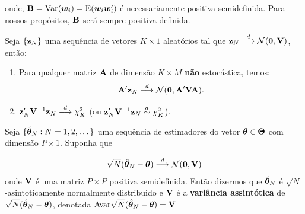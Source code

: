 \documentclass[11pt, oneside, a4paper, article]{article}
\numberwithin{equation}{section}
\begin{document}
\begin{description}
\begin{teo}
\noindent
onde, $\mathbf{B} = \text{Var}(\boldsymbol{w}_{i}) = \text{E}( \boldsymbol{w}_{i} \boldsymbol{w}_{i}')$ é necessariamente positiva semidefinida.
Para nossos propósitos, $\mathbf{B}$ será sempre positiva definida.
\end{teo}

\begin{cor}[]
\citet[Cor 3.2, p.39]{wool-2010}

Seja $\{\mathbf{z}_{N}\}$ uma sequência de vetores $K \times 1$ aleatórios tal que
$\mathbf{z}_{N}  \overset{d}{\longrightarrow}  \mathcal{N}(\boldsymbol{0}, \mathbf{V})$, então:

\begin{enumerate}
	\item 
Para qualquer matriz $\mathbf{A}$ de dimensão $K \times M$ \textbf{não} estocástica, temos:
\begin{align*}
\mathbf{A}' \mathbf{z}_{N}  \overset{d}{\longrightarrow}  \mathcal{N}(\boldsymbol{0}, \mathbf{A}'\mathbf{V}\mathbf{A}).
\end{align*}

\item $\mathbf{z}_{N}'\mathbf{V}^{-1}\mathbf{z}_{N}  \overset{d}{\longrightarrow}  \chi^{2}_{K}$ (ou $\mathbf{z}_{N}'\mathbf{V}^{-1}\mathbf{z}_{N} \overset{a}{\sim} \chi^{2}_{K}$).
\end{enumerate}


\end{cor}

\begin{defn}
\citet[Def 3.9, p.40]{wool-2010}

Seja $\{\hat{\boldsymbol{\theta}}_{N}: N=1,2,\dots\}$ uma sequência de estimadores do vetor $\boldsymbol{\theta} \in \boldsymbol{\Theta}$ com dimensão $P \times 1$.
Suponha que

\vspace{-1 em} 
\begin{align}\label{nroot:conv}
	\sqrt{N}(\hat{\boldsymbol{\theta}}_{N} - \boldsymbol{\theta}) 
	 \overset{d}{\longrightarrow}  
	\mathcal{N}(\boldsymbol{0}, \mathbf{V})
\end{align}
onde $\mathbf{V}$ é uma matriz $P \times P$ positiva semidefinida.
Então dizermos que $\hat{\boldsymbol{\theta}}_{N}$ é $\sqrt{N}$-asintoticamente normalmente distribuido e
$\mathbf{V}$ é a \textbf{variância assintótica} de 
$\sqrt{N}(\hat{\boldsymbol{\theta}}_{N} - \boldsymbol{\theta})$,
denotada $\text{Avar} \sqrt{N}(\hat{\boldsymbol{\theta}}_{N} - \boldsymbol{\theta}) = \mathbf{V}$
\end{defn}


\end{description}
\end{document}
